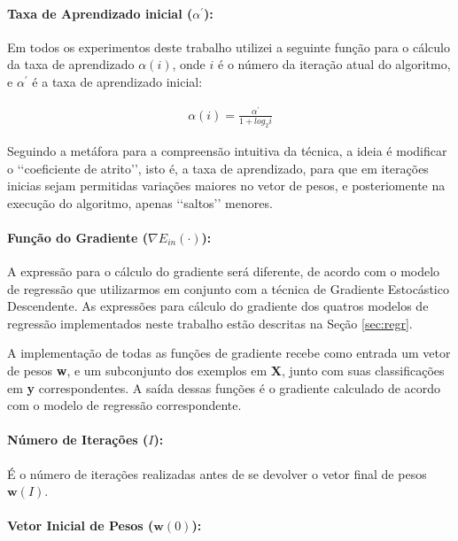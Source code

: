 \documentclass[a4paper, 12pt]{article}
\begin{document}
\paragraph{Taxa de Aprendizado inicial ($\alpha^{\prime}$):}

Em todos os experimentos deste trabalho utilizei a seguinte função
para o cálculo da taxa de aprendizado $\alpha(i)$, onde $i$ é o número da
iteração atual do algoritmo, e $\alpha^{\prime}$ é a taxa de aprendizado
inicial:

\begin{align*}
    \alpha(i) = \frac{\alpha^{\prime}}{1 + log_{2}i}
\end{align*}

Seguindo a metáfora para a compreensão intuitiva da técnica, a ideia é
modificar o \lq\lq{}coeficiente de atrito\rq\rq{}, isto é, a taxa de
aprendizado, para que em iterações inicias sejam permitidas variações maiores
no vetor de pesos, e posteriomente na execução do algoritmo, apenas
\lq\lq{}saltos\rq\rq{} menores.

\paragraph{Função do Gradiente ($\nabla{}E_{in}(\cdot)$):}

A expressão para o cálculo do gradiente será diferente, de acordo com o modelo
de regressão que utilizarmos em conjunto com a técnica de Gradiente Estocástico
Descendente. As expressões para cálculo do gradiente dos quatros modelos de
regressão implementados neste trabalho estão descritas na Seção \ref{sec:regr}.

A implementação de todas as funções de gradiente recebe como entrada um vetor
de pesos \textbf{w}, e um subconjunto dos exemplos em \textbf{X}, junto com
suas classificações em \textbf{y} correspondentes. A saída dessas funções é o
gradiente calculado de acordo com o modelo de regressão correspondente.

\paragraph{Número de Iterações ($I$):}

É o número de iterações realizadas antes de se devolver o vetor final de pesos
$\textbf{w}(I)$.

\paragraph{Vetor Inicial de Pesos ($\textbf{w}(0)$):}
\end{document}
